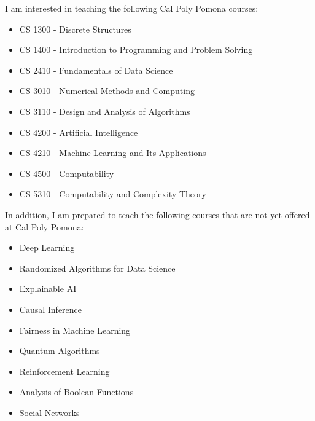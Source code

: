 \documentclass[11pt]{article}
\begin{document}
I am interested in teaching the following Cal Poly Pomona courses:

\begin{itemize}
    \item CS 1300 - Discrete Structures
    \item CS 1400 - Introduction to Programming and Problem Solving
    \item CS 2410 - Fundamentals of Data Science
    \item CS 3010 - Numerical Methods and Computing
    \item CS 3110 - Design and Analysis of Algorithms
    \item CS 4200 - Artificial Intelligence
    \item CS 4210 - Machine Learning and Its Applications
    \item CS 4500 - Computability
    \item CS 5310 - Computability and Complexity Theory
\end{itemize}

In addition, I am prepared to teach the following courses that are not yet offered at Cal Poly Pomona:
\begin{itemize}
    \item Deep Learning
    \item Randomized Algorithms for Data Science
    \item Explainable AI
    \item Causal Inference
    \item Fairness in Machine Learning
    \item Quantum Algorithms
    \item Reinforcement Learning
    \item Analysis of Boolean Functions
    \item Social Networks
\end{itemize}
\end{document}

